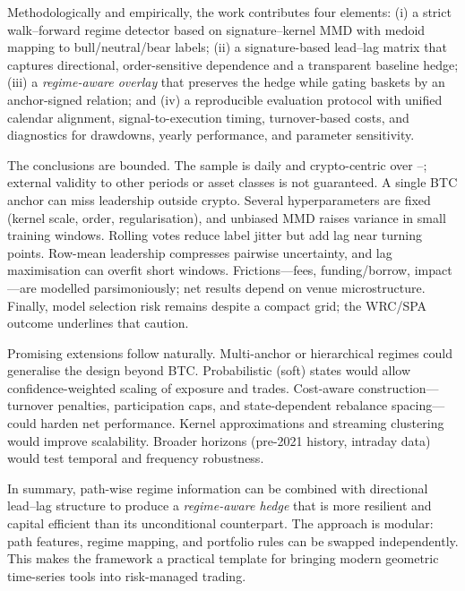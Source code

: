 Methodologically and empirically, the work contributes four elements: (i) a strict walk–forward regime detector based on signature–kernel MMD with medoid mapping to bull/neutral/bear labels; (ii) a signature-based lead--lag matrix that captures directional, order-sensitive dependence and a transparent baseline hedge; (iii) a \emph{regime-aware overlay} that preserves the hedge while gating baskets by an anchor-signed relation; and (iv) a reproducible evaluation protocol with unified calendar alignment, signal-to-execution timing, turnover-based costs, and diagnostics for drawdowns, yearly performance, and parameter sensitivity.

The conclusions are bounded. The sample is daily and crypto-centric over \sampleStart{}–\sampleEnd{}; external validity to other periods or asset classes is not guaranteed. A single BTC anchor can miss leadership outside crypto. Several hyperparameters are fixed (kernel scale, order, regularisation), and unbiased MMD raises variance in small training windows. Rolling votes reduce label jitter but add lag near turning points. Row-mean leadership compresses pairwise uncertainty, and lag maximisation can overfit short windows. Frictions—fees, funding/borrow, impact—are modelled parsimoniously; net results depend on venue microstructure. Finally, model selection risk remains despite a compact grid; the WRC/SPA outcome underlines that caution.

Promising extensions follow naturally. Multi-anchor or hierarchical regimes could generalise the design beyond BTC. Probabilistic (soft) states would allow confidence-weighted scaling of exposure and trades. Cost-aware construction—turnover penalties, participation caps, and state-dependent rebalance spacing—could harden net performance. Kernel approximations and streaming clustering would improve scalability. Broader horizons (pre-2021 history, intraday data) would test temporal and frequency robustness.

In summary, path-wise regime information can be combined with directional lead--lag structure to produce a \emph{regime-aware hedge} that is more resilient and capital efficient than its unconditional counterpart. The approach is modular: path features, regime mapping, and portfolio rules can be swapped independently. This makes the framework a practical template for bringing modern geometric time-series tools into risk-managed trading.
